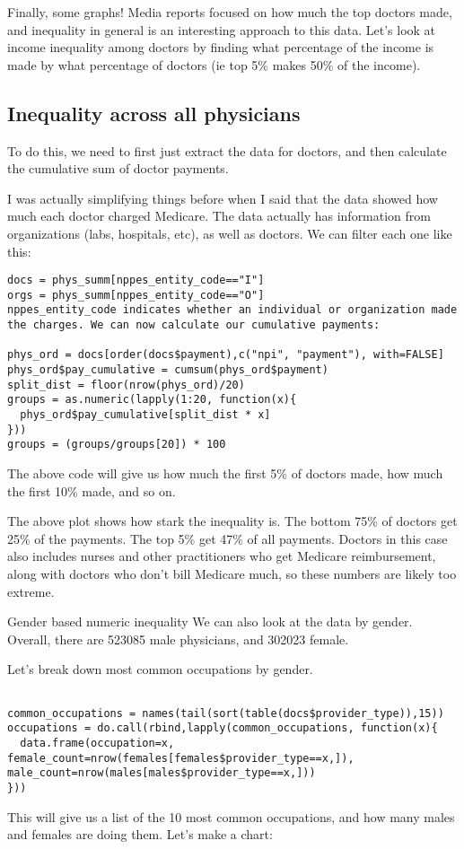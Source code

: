 Finally, some graphs!
Media reports focused on how much the top doctors made, and inequality in general is an interesting approach to this data. Let's look at income inequality among doctors by finding what percentage of the income is made by what percentage of doctors (ie top 5\% makes 50\% of the income).

\subsection*{Inequality across all physicians}
To do this, we need to first just extract the data for doctors, and then calculate the cumulative sum of doctor payments.

I was actually simplifying things before when I said that the data showed how much each doctor charged Medicare. The data actually has information from organizations (labs, hospitals, etc), as well as doctors. We can filter each one like this:

\begin{framed}
\begin{verbatim}
docs = phys_summ[nppes_entity_code=="I"]
orgs = phys_summ[nppes_entity_code=="O"]
nppes_entity_code indicates whether an individual or organization made the charges. We can now calculate our cumulative payments:

phys_ord = docs[order(docs$payment),c("npi", "payment"), with=FALSE]
phys_ord$pay_cumulative = cumsum(phys_ord$payment)
split_dist = floor(nrow(phys_ord)/20)
groups = as.numeric(lapply(1:20, function(x){
  phys_ord$pay_cumulative[split_dist * x]
}))
groups = (groups/groups[20]) * 100
\end{verbatim}
\end{framed}

The above code will give us how much the first 5\% of doctors made, how much the first 10\% made, and so on.

The above plot shows how stark the inequality is. The bottom 75\% of doctors get 25\% of the payments. The top 5\% get 47\% of all payments. Doctors in this case also includes nurses and other practitioners who get Medicare reimbursement, along with doctors who don't bill Medicare much, so these numbers are likely too extreme.

Gender based numeric inequality
We can also look at the data by gender. Overall, there are 523085 male physicians, and 302023 female.

Let's break down most common occupations by gender.

\begin{framed}
\begin{verbatim}

common_occupations = names(tail(sort(table(docs$provider_type)),15))
occupations = do.call(rbind,lapply(common_occupations, function(x){
  data.frame(occupation=x, female_count=nrow(females[females$provider_type==x,]), male_count=nrow(males[males$provider_type==x,]))
}))
\end{verbatim}
\end{framed}
This will give us a list of the 10 most common occupations, and how many males and females are doing them. Let's make a chart:

